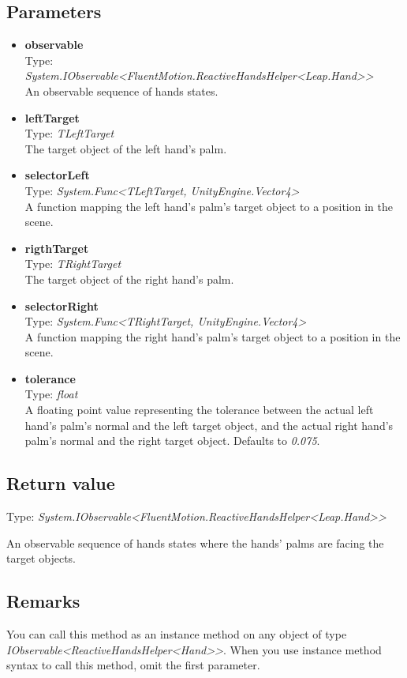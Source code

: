 \documentclass[12pt,a4paper,twoside]{report}
\begin{document}
\subsection{Parameters}
\begin{itemize}
  \item \textbf{observable}\\
    Type: \textit{System.IObservable<FluentMotion.ReactiveHandsHelper<Leap.Hand>{}>}\\
    An observable sequence of hands states.
  \item \textbf{leftTarget}\\
    Type: \textit{TLeftTarget}\\
    The target object of the left hand's palm.
  \item \textbf{selectorLeft}\\
    Type: \textit{System.Func<TLeftTarget, UnityEngine.Vector4>}\\
    A function mapping the left hand's palm's target object to a position in the scene.
  \item \textbf{rigthTarget}\\
    Type: \textit{TRightTarget}\\
    The target object of the right hand's palm.
  \item \textbf{selectorRight}\\
    Type: \textit{System.Func<TRightTarget, UnityEngine.Vector4>}\\
    A function mapping the right hand's palm's target object to a position in the scene.
  \item \textbf{tolerance}\\
    Type: \textit{float}\\
    A floating point value representing the tolerance between the actual left hand's palm's normal and the left target object, and the actual right hand's palm's normal and the right target object. Defaults to \textit{0.075}.
\end{itemize}

\subsection{Return value}
Type: \textit{System.IObservable<FluentMotion.ReactiveHandsHelper<Leap.Hand>{}>}

An observable sequence of hands states where the hands' palms are facing the target objects.

\subsection{Remarks}
You can call this method as an instance method on any object of type \textit{IObservable<ReactiveHandsHelper<Hand>{}>}. When you use instance method syntax to call this method, omit the first parameter.
\end{document}
